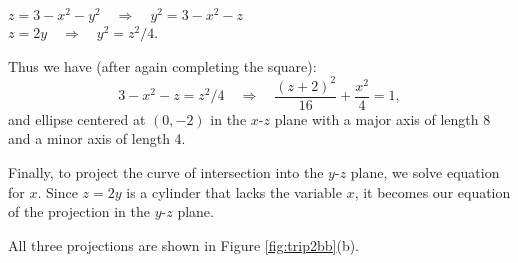{\noindent $z=3-x^2-y^2 \quad \Rightarrow \quad y^2=3-x^2-z$\\
\noindent $z=2y \quad \Rightarrow \quad y^2=z^2/4$.

Thus we have (after again completing the square):
$$3-x^2-z = z^2/4 \quad \Rightarrow\quad \frac{(z+2)^2}{16}+\frac{x^2}4=1,$$
and ellipse centered at $(0,-2)$ in the $x$-$z$ plane with a major axis of length 8 and a minor axis of length 4. 

Finally, to project the curve of intersection into the $y$-$z$ plane, we solve equation for $x$. Since $z=2y$ is a cylinder that lacks the variable $x$, it becomes our equation of the projection in the $y$-$z$ plane.

All three projections are shown in Figure \ref{fig:trip2bb}(b).
}\\

